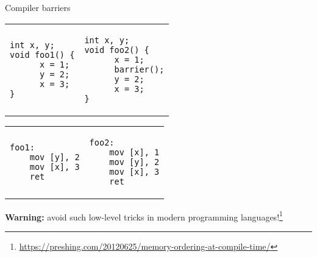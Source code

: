 \begin{frame}[t, fragile]{Compiler barriers}

\vspace{-0.5cm}
\begin{tabular}{p{} p{}}
\begin{verbatim}
int x, y;
void foo1() {
      x = 1;
      y = 2;
      x = 3;
}
\end{verbatim}

& 

\begin{verbatim}
int x, y;
void foo2() {
      x = 1;
      barrier();
      y = 2;
      x = 3;
}
\end{verbatim}
\end{tabular}

\pause
\vspace{-0.5cm}

\begin{tabular}{p{} p{}}

\begin{verbatim}
foo1:
    mov [y], 2
    mov [x], 3
    ret
\end{verbatim}

& 

\begin{verbatim}
foo2:
    mov [x], 1
    mov [y], 2
    mov [x], 3
    ret
\end{verbatim}
\end{tabular}

\pause

\textbf{Warning:} avoid such low-level tricks in modern programming languages!\footnote<3->{\tiny\url{https://preshing.com/20120625/memory-ordering-at-compile-time/}}

\end{frame}




